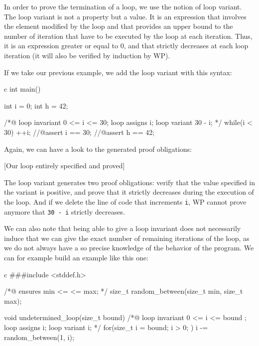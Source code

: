 \documentclass[middle]{zmdocument}
\begin{document}
In order to prove the termination of a loop, we use the notion of loop
variant. The loop variant is not a property but a value. It is an
expression that involves the element modified by the loop and that
provides an upper bound to the number of iteration that have to be
executed by the loop at each iteration. Thus, it is an expression
greater or equal to 0, and that strictly decreases at each loop
iteration (it will also be verified by induction by WP).


If we take our previous example, we add the loop variant with this
syntax:



\begin{CodeBlock}{c}
int main(){
  int i = 0;
  int h = 42;
  
  /*@
    loop invariant 0 <= i <= 30;
    loop assigns i;
    loop variant 30 - i;
  */
  while(i < 30){
    ++i;
  }
  //@assert i == 30;
  //@assert h == 42;
}
\end{CodeBlock}



Again, we can have a look to the generated proof obligations:



[Our loop entirely specified and proved]


The loop variant generates two proof obligations: verify that the value
specified in the variant is positive, and prove that it strictly
decreases during the execution of the loop. And if we delete the line of
code that increments \texttt{i}, WP cannot prove anymore that
\texttt{30\ -\ i} strictly decreases.

We can also note that being able to give a loop invariant does not
necessarily induce that we can give the exact number of remaining
iterations of the loop, as we do not always have a so precise knowledge
of the behavior of the program. We can for example build an example like
this one:



\begin{CodeBlock}{c}
###include <stddef.h>

/*@
  ensures min <= \result <= max;
*/
size_t random_between(size_t min, size_t max);

void undetermined_loop(size_t bound){
  /*@
    loop invariant 0 <= i <= bound ;
    loop assigns i;
    loop variant i;
   */
  for(size_t i = bound; i > 0; ){
    i -= random_between(1, i);
  }
}
\end{CodeBlock}
\end{document}
